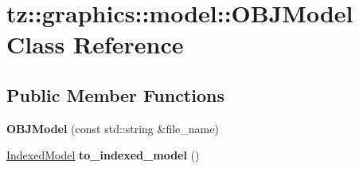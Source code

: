 \hypertarget{classtz_1_1graphics_1_1model_1_1_o_b_j_model}{}\section{tz\+:\+:graphics\+:\+:model\+:\+:O\+B\+J\+Model Class Reference}
\label{classtz_1_1graphics_1_1model_1_1_o_b_j_model}
\subsection*{Public Member Functions}
\begin{DoxyCompactItemize}
\item 
\mbox{\label{classtz_1_1graphics_1_1model_1_1_o_b_j_model_a12782990aef3edbf3989dd5115a27c2d}} 
{\bfseries O\+B\+J\+Model} (const std\+::string \&file\+\_\+name)
\item 
\mbox{\label{classtz_1_1graphics_1_1model_1_1_o_b_j_model_ad0dcb65ddcdf1bb21e74b97235bfa215}} 
\mbox{\hyperlink{classtz_1_1graphics_1_1model_1_1_indexed_model}{Indexed\+Model}} {\bfseries to\+\_\+indexed\+\_\+model} ()
\end{DoxyCompactItemize}
